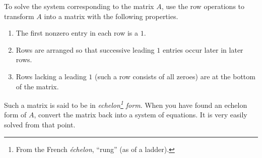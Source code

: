 \documentclass[twocolumn,12pt]{article}
\begin{document}
To solve the system corresponding to the matrix $A$, use the row operations to transform $A$ into a matrix with the following properties.
\begin{enumerate}[(1)]
    \item The first nonzero entry in each row is a $1$.
    \item Rows are arranged so that successive leading $1$ entries occur later in later rows.
    \item Rows lacking a leading $1$ (such a row consists of all zeroes) are at the bottom of the matrix.
\end{enumerate}
Such a matrix is said to be in \emph{echelon\footnote{From the French \emph{\'echelon}, ``rung'' (as of a ladder).} form}. When you have found an echelon form of $A$, convert the matrix back into a system of equations. It is very easily solved from that point.
\end{document}
